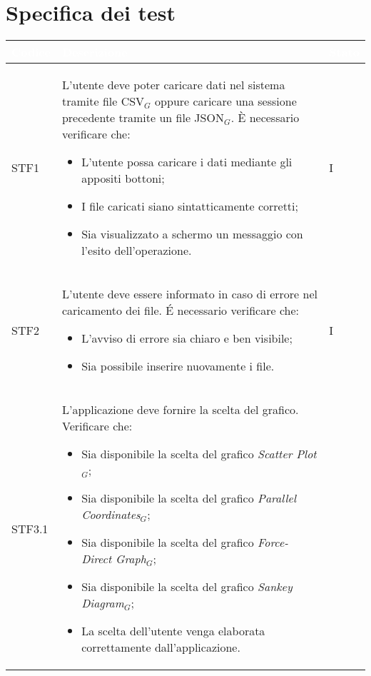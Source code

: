 \section{Specifica dei test}
\begin{center}
    \renewcommand\arraystretch{1.5}
    \centering
    \begin{longtable}{|p{1.5cm}|p{11cm}|p{1cm}|}
    \hline
    \rowcolor[HTML]{036400}
    \textcolor{white}{\textbf{Codice}} & \textcolor{white}{\textbf{Descrizione}} & \textcolor{white}{\textbf{Stato}} \\ \hline
        \rowcolor[HTML]{EFEFEF}
        STF1 & L'utente deve poter caricare dati nel sistema tramite file CSV$_G$ oppure caricare una sessione precedente tramite un file JSON$_G$. \`E necessario verificare che: \begin{itemize}
            \item L'utente possa caricare i dati mediante gli appositi bottoni;
            \item I file caricati siano sintatticamente corretti;
            \item Sia visualizzato a schermo un messaggio con l'esito dell'operazione.
        \end{itemize} & I\\ \hline
        \rowcolor[HTML]{C0C0C0}
        STF2 & L'utente deve essere informato in caso di errore nel caricamento dei file. \'E necessario verificare che: \begin{itemize}
            \item L'avviso di errore sia chiaro e ben visibile;
            \item Sia possibile inserire nuovamente i file.
        \end{itemize} & I\\ \hline
        \rowcolor[HTML]{EFEFEF}
        STF3.1 & L'applicazione deve fornire la scelta del grafico. Verificare che: \begin{itemize}
            \item Sia disponibile la scelta del grafico \textit{Scatter Plot}$_G$;
            \item Sia disponibile la scelta del grafico \textit{Parallel Coordinates}$_G$;
            \item Sia disponibile la scelta del grafico \textit{Force-Direct Graph}$_G$;
            \item Sia disponibile la scelta del grafico \textit{Sankey Diagram}$_G$;
            \item La scelta dell'utente venga elaborata correttamente dall'applicazione.

\end{itemize}
\end{longtable}
\end{center}
